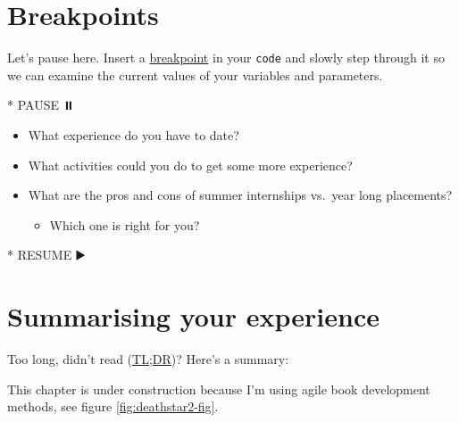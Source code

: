 \documentclass[
]{book}
\newenvironment{Shaded}{\begin{snugshade}}{\end{snugshade}}
\newcommand{\NormalTok}[1]{#1}
\newcommand{\SpecialStringTok}[1]{\textcolor[rgb]{0.31,0.60,0.02}{#1}}
\providecommand{\tightlist}{%
  \setlength{\itemsep}{0pt}\setlength{\parskip}{0pt}}
\begin{document}
\hypertarget{bp5}{%
\section{Breakpoints}\label{bp5}}

Let's pause here. Insert a \href{https://en.wikipedia.org/wiki/Breakpoint}{breakpoint} in your \texttt{code} and slowly step through it so we can examine the current values of your variables and parameters.

\begin{Shaded}
\begin{Highlighting}[]
\SpecialStringTok{* }\NormalTok{PAUSE ⏸️}
\end{Highlighting}
\end{Shaded}

\begin{itemize}
\tightlist
\item
  What experience do you have to date?
\item
  What activities could you do to get some more experience?
\item
  What are the pros and cons of summer internships vs.~year long placements?

  \begin{itemize}
  \tightlist
  \item
    Which one is right for you?
  \end{itemize}
\end{itemize}

\begin{Shaded}
\begin{Highlighting}[]
\SpecialStringTok{* }\NormalTok{RESUME ▶️}
\end{Highlighting}
\end{Shaded}

\hypertarget{tldr5}{%
\section{Summarising your experience}\label{tldr5}}

Too long, didn't read (\href{https://en.wiktionary.org/wiki/too_long;_didn\%27t_read}{TL;DR})? Here's a summary:

This chapter is under construction because I'm using agile book development methods, see figure \ref{fig:deathstar2-fig}.
\end{document}
